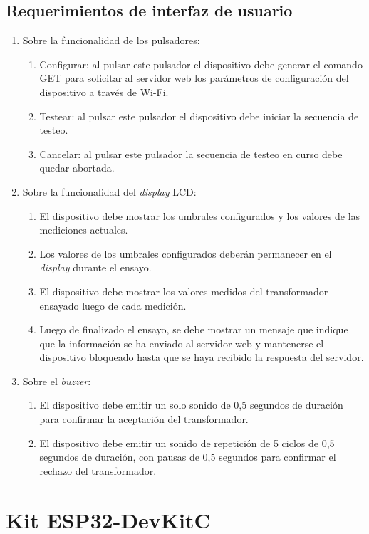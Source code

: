 \subsection{Requerimientos de interfaz de usuario}
	\begin{enumerate}
	\item Sobre la funcionalidad de los pulsadores:
		\begin{enumerate}
		\item Configurar: al pulsar este pulsador el dispositivo debe generar el comando GET para solicitar al servidor web los parámetros de configuración del dispositivo a través de Wi-Fi.
		\item Testear: al pulsar este pulsador el dispositivo debe iniciar la secuencia de testeo.
		\item Cancelar: al pulsar este pulsador la secuencia de testeo en curso debe quedar abortada.
		\end{enumerate}
	\item Sobre la funcionalidad del \textit{display} LCD:
		\begin{enumerate}
		\item El dispositivo debe mostrar los umbrales configurados y los valores de las mediciones actuales.
		\item Los valores de los umbrales configurados deberán permanecer en el \textit{display} durante el ensayo.
		\item El dispositivo debe mostrar los valores medidos del transformador ensayado luego de cada medición.
		\item Luego de finalizado el ensayo, se debe mostrar un mensaje que indique que la información se ha enviado al servidor web y mantenerse el dispositivo bloqueado hasta que se haya recibido la respuesta del servidor.
		\end{enumerate}
	\item Sobre el \textit{buzzer}:
		\begin{enumerate}
		\item El dispositivo debe emitir un solo sonido de 0,5 segundos de duración para confirmar la aceptación del transformador.
		\item El dispositivo debe emitir un sonido de repetición de 5 ciclos de 0,5 segundos de duración, con pausas de 0,5 segundos para confirmar el rechazo del transformador.
		\end{enumerate}		
	\end{enumerate}


\section{Kit ESP32-DevKitC}

